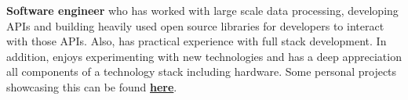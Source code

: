 
\begin{cvparagraph}
\textbf{Software engineer} who has worked with large scale data processing, developing APIs and building heavily used open source libraries for developers to interact with those APIs. Also, has practical experience with full stack development. In addition, enjoys experimenting with new technologies and has a deep appreciation all components of a technology stack including hardware. Some personal projects showcasing this can be found \href{https://sujaygarlanka.com/projects.html}{\textbf{\color{awesome}here}}.
\end{cvparagraph}
